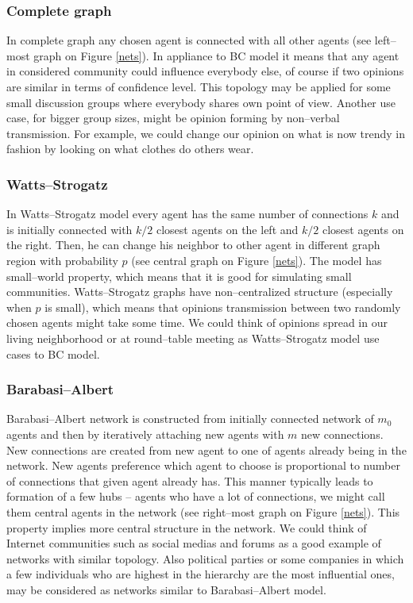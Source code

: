 \documentclass{article}
\begin{document}
\subsubsection{Complete graph}
In complete graph any chosen agent is connected with all other agents (see left--most graph on Figure \ref{nets}). In appliance to BC model it means that any agent in considered community could influence everybody else, of course if two opinions are similar in terms of confidence level. This topology may be applied for some small discussion groups where everybody shares own point of view. Another use case, for bigger group sizes, might be opinion forming by non--verbal transmission. For example, we could change our opinion on what is now trendy in fashion by looking on what clothes do others wear.

\subsubsection{Watts--Strogatz}
In Watts--Strogatz model every agent has the same number of connections $k$ and is initially connected with $k/2$ closest agents on the left and $k/2$ closest agents on the right. Then, he can change his neighbor to other agent in different graph region with probability $p$ (see central graph on Figure \ref{nets}). The model has small--world property, which means that it is good for simulating small communities. Watts--Strogatz graphs have non--centralized structure (especially when $p$ is small), which means that opinions transmission between two randomly chosen agents might take some time. We could think of opinions spread in our living neighborhood or at round--table meeting as Watts--Strogatz model use cases to BC model.

\subsubsection{Barabasi--Albert}
Barabasi--Albert network is constructed from initially connected network of $m_0$ agents and then by iteratively attaching new agents with $m$ new connections. New connections are created from new agent to one of agents already being in the network. New agents preference which agent to choose is proportional to number of connections that given agent already has. This manner typically leads to formation of a few hubs -- agents who have a lot of connections, we might call them central agents in the network (see right--most graph on Figure \ref{nets}). This property implies more central structure in the network. We could think of Internet communities such as social medias and forums as a good example of networks with similar topology. Also political parties or some companies in which a few individuals who are highest in the hierarchy are the most influential ones, may be considered as networks similar to Barabasi--Albert model.
\end{document}
